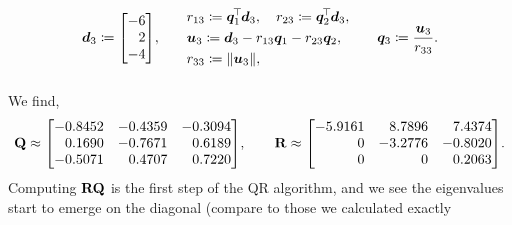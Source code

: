\documentclass[11pt]{article}
\begin{document}
\begin{enumerate}
\[\begin{alignedat}{3}
                  \vect{d}_3
                  \coloneq
                  \begin{bmatrix*}[r]
                      -6 \\ 2 \\ -4
                  \end{bmatrix*}
                  \! ,
                  \qquad
                   &   &
                  \begin{aligned}
                       &
                      r_{13} \coloneq \vect{q}_1^{\T} \vect{d}_3,
                      \quad
                      r_{23} \coloneq \vect{q}_2^{\T} \vect{d}_3,
                      \\
                       &
                      \vect{u}_3
                      \coloneq
                      \vect{d}_3
                      - r_{13} \vect{q}_1
                      - r_{23} \vect{q}_2,
                      \\
                       &
                      r_{33} \coloneq \norm{\vect{u}_3},
                  \end{aligned}
                  \qquad
                   &   &
                  \vect{q}_3
                  \coloneq
                  \frac{\vect{u}_3}{r_{33}}
                  .
                  \\[1em]
              \end{alignedat}
          \]
          We find,
          \[
              \mat{Q} \approx
              \begin{bmatrix*}[r]
                  -0.8452 & -0.4359 & -0.3094 \\
                  0.1690 & -0.7671 & 0.6189 \\
                  -0.5071 & 0.4707 & 0.7220 \\
              \end{bmatrix*}
              \! ,
              \qquad
              \mat{R} \approx
              \begin{bmatrix*}[r]
                  -5.9161 & 8.7896 & 7.4374 \\
                  0 & -3.2776 & -0.8020 \\
                  0 & 0 & 0.2063 \\
              \end{bmatrix*}
              \! .
          \]
          Computing $\mathbf{R} \mathbf{Q}$ is the first step of the QR algorithm, and we see the
          eigenvalues start to emerge on the diagonal (compare to those we calculated exactly

\end{enumerate}
\end{document}

